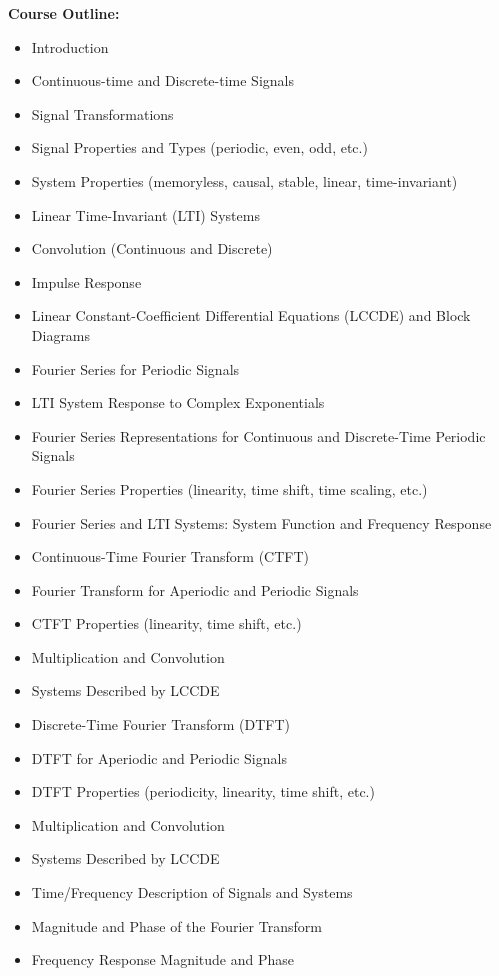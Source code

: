 \documentclass[12pt]{article}
\begin{document}
\textbf{Course Outline:}
\begin{itemize}
    \item Introduction
    \item Continuous-time and Discrete-time Signals
    \item Signal Transformations
    \item Signal Properties and Types (periodic, even, odd, etc.)
    \item System Properties (memoryless, causal, stable, linear, time-invariant)
    \item Linear Time-Invariant (LTI) Systems
    \item Convolution (Continuous and Discrete)
    \item Impulse Response
    \item Linear Constant-Coefficient Differential Equations (LCCDE) and Block Diagrams
    \item Fourier Series for Periodic Signals
    \item LTI System Response to Complex Exponentials
    \item Fourier Series Representations for Continuous and Discrete-Time Periodic Signals
    \item Fourier Series Properties (linearity, time shift, time scaling, etc.)
    \item Fourier Series and LTI Systems: System Function and Frequency Response
    \item Continuous-Time Fourier Transform (CTFT)
    \item Fourier Transform for Aperiodic and Periodic Signals
    \item CTFT Properties (linearity, time shift, etc.)
    \item Multiplication and Convolution
    \item Systems Described by LCCDE
    \item Discrete-Time Fourier Transform (DTFT)
    \item DTFT for Aperiodic and Periodic Signals
    \item DTFT Properties (periodicity, linearity, time shift, etc.)
    \item Multiplication and Convolution
    \item Systems Described by LCCDE
    \item Time/Frequency Description of Signals and Systems
    \item Magnitude and Phase of the Fourier Transform
    \item Frequency Response Magnitude and Phase

\end{itemize}
\end{document}
